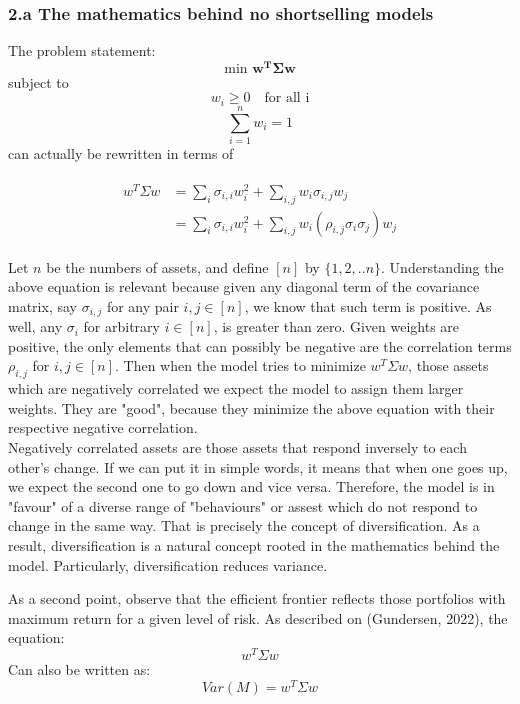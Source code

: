 \documentclass[11pt]{article}
\begin{document}
\subsubsection*{2.a The mathematics behind no shortselling models}
The problem statement:
\[\text{min } \mathbf{w^T\Sigma w}\]
subject to 
\[w_i \geq 0 \quad \text{for all i}\]
\[\sum_{i=1}^n w_i=1\]
can actually be rewritten in terms of 

\begin{align*}
\begin{split}
w^T \Sigma w 
&= \sum_{i} {\sigma_{i,i} w_i^2} + \sum_{i,j} {w_i \sigma_{i,j} w_j} \\
&= \sum_{i} {\sigma_{i,i} w_i^2} + \sum_{i,j} {w_i \left (\rho_{i,j}  \sigma_i  \sigma_j \right) w_j}
\end{split}
\end{align*}

Let $n$ be the numbers of assets, and define $[n]$ by $\{1,2,..n\}$.
Understanding the above equation is relevant because given any diagonal term of the covariance matrix, say $\sigma_{i,j}$ for any pair ${i,j} \in[n]$, we know that such term is positive. As well, any $\sigma_{i}$ for arbitrary ${i} \in[n]$, is greater than zero. Given weights are positive, the only elements that can possibly be negative are the correlation terms $\rho_{i,j}$ for ${i,j} \in[n]$. Then when the model tries to minimize $w^T \Sigma w $, those assets which are negatively correlated we expect the model to assign them larger weights. They are "good", because they minimize the above equation with their respective negative correlation.\\

Negatively correlated assets are those assets that respond inversely to each other's change. If we can put it in simple words, it means that when one goes up, we expect the second one to go down and vice versa. Therefore, the model is in "favour" of a diverse range of "behaviours" or assest which do not respond to change in the same way. That is precisely the concept of diversification. As a result, diversification is a natural concept rooted in the mathematics behind the model. Particularly, diversification reduces variance.

As a second point, observe that the efficient frontier reflects those portfolios with maximum return for a given level of risk. As described on (Gundersen, 2022), the equation:
\begin{equation}
    w^T \Sigma w
\end{equation}
Can also be written as:
\begin{equation}
    Var(M) = w^T \Sigma w 
\end{equation}
\end{document}
